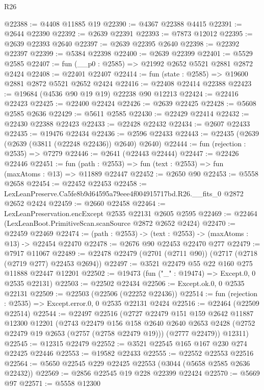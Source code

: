 \begin{lexlean}{R26}
\begin{coremodule}
@22388 := @4408 @11885 @19
@22390 := @4367 @22388 @4415
@22391 := @2644 @22390
@22392 := @2639 @22391
@22393 := @7873 @12012
@22395 := @2639 @22393 @2640
@22397 := @2639 @22395 @2640
@22398 := @22392 @22397
@22399 := @5384 @22398
@22400 := @2639 @22399
@22401 := @5529 @2585
@22407 := fun (__p0 : @2585) => @21992 @2652 @5521 @2881 @2872 @2424
@22408 := @22401 @22407
@22414 := fun (state : @2585) => @19600 @2881 @2872 @5521 @2652 @2424
@22416 := @22408 @22414 @22388
@22423 := @19684 (@4536 @90 @19 @19) @22238 @90 @12213
@22424 := @22416 @22423
@22425 := @22400 @22424
@22426 := @2639 @22425
@22428 := @5608 @2585 @2636
@22429 := @5611 @2585
@22430 := @22429 @22414
@22432 := @22430 @22388 @22423
@22433 := @22428 @22432
@22434 := @2607 @22433
@22435 := @19476 @22434
@22436 := @2596 @22433
@22443 := @22435 (@2639 (@2639 (@3811 (@22248 @22436)) @2640) @2640)
@22444 := fun (rejection : @2535) => @7279
@22446 := @2641 (@22443 @22444)
@22447 := @22426 @22446
@22451 := fun (path : @2553) => fun (text : @2553) => fun (maxAtoms : @13) => @11889 @22447
@22452 := @2650 @90
@22453 := @5558 @2658
@22454 := @22452 @22453
@22458 := LexLeanPreserve.Ca5fe8b9d64595a79eee4f004915717bd.R26.__fits_0 @2872 @2652 @2424
@22459 := @2660 @22458
@22464 := LexLeanPreservation.encExcept @2535 @22131 @2605 @2595
@22469 := @22464 (LexLeanBoot.PrimitiveScan.scanSource @2872 @2652 @2424)
@22470 := @22459 @22469
@22474 := (path : @2553) -> (text : @2553) -> (maxAtoms : @13) -> @22454 @22470
@22478 := @2676 @90 @22453 @22470 @277
@22479 := @7917 @11067
@22489 := @22478 @22479 (@2701 (@2711 @90)) (@2717 (@2718 (@2719 @277) @22453 @2694))
@22497 := @3521 @22479 @55 @22 @160 @275 @11888 @22447 @12201
@22502 := @19473 (fun ("_" : @19474) => Except.{0, 0} @2535 @22131)
@22503 := @22502 @22434
@22506 := Except.ok.{0, 0} @2535 @22131
@22509 := @22503 (@22506 (@22252 @22436))
@22514 := fun (rejection : @2535) => Except.error.{0, 0} @2535 @22131 @2424
@22516 := @22464 (@22509 @22514)
@22544 := @22497
    @22516
    (@2727
      @22479
      @151
      @159
      @2642
      @11887
      @12300
      @12201
      (@2743
        @22479
        @156
        @158
        @2640
        @2640
        @2653
        @2428
        (@2752 @22479 @19 @2653 (@2757 (@2758 @22479 @19)))
        (@2777 @22479))
      @12311)
@22545 := @12315 @22479
@22552 := @3521 @22545 @165 @167 @230 @274 @22425 @22446
@22553 := @19582 @22433
@22555 := @22552 @22553 @22516
@22564 := @5650 @22545 @229 @22425 @22553 (@3044 (@5658 @2585 @2636 @22432))
@22569 := @2856 @22545 @19 @228 @22399 @22424
@22570 := @5669 @97
@22571 := @5558 @12300

\end{coremodule}
\end{lexlean}
